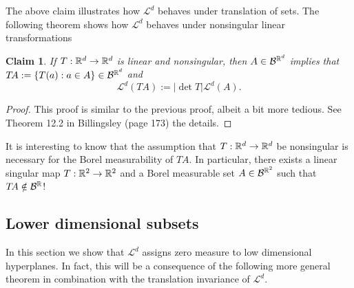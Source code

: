 \documentclass[10pt,letterpaper,twocolumn]{article}
\newtheorem{claim}{Claim}
\begin{document}
The above claim illustrates how $\mathcal L^d$ behaves under translation of sets. The following theorem shows how $\mathcal L^d$ behaves under nonsingular linear transformations
\begin{claim}
If $T:\Bbb R^d\rightarrow \Bbb R^d$ is linear and nonsingular, then $A\in\mathcal B^{\Bbb R^d }$ implies that $T\!A:=\{ T(a): a\in A\}\in \mathcal B^{\Bbb R^d }$ and 
\[ \mathcal L^d(T\!A):=|\det T |\mathcal L^d(A). \]
\end{claim}
\begin{proof}
This proof is similar to the previous proof, albeit a bit more tedious. See Theorem 12.2 in Billingsley (page 173) the details.
\end{proof}
It is interesting to know that the assumption that $T:\Bbb R^d\rightarrow \Bbb R^d$ be nonsingular is necessary for the Borel measurability of $T\!A$. In particular, there exists a linear singular map $T:\Bbb R^2\rightarrow \Bbb R^2$ and a Borel measurable set $A\in \mathcal B^{\Bbb R^2}$ such that $T\!A\notin \mathcal B^{\Bbb R}$!

\subsection{Lower dimensional subsets}
In this section we show that $\mathcal L^d$ assigns zero measure to low dimensional hyperplanes. In fact, this will be a consequence of the following more general theorem in combination with the translation invariance of $\mathcal L^d$. 
\end{document}
